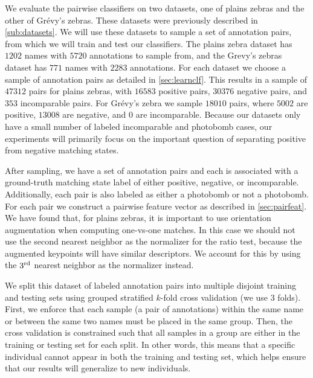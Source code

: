     We evaluate the pairwise classifiers on two datasets, one of plains zebras and the other of Grévy's zebras.
    These datasets were previously described in \cref{sub:datasets}.
    We will use these datasets to sample a set of annotation pairs, from which we will train and test our
      classifiers.
    The plains zebra dataset has $1202$ names with $5720$ annotations to sample from, and the Grevy's zebras
      dataset has $771$ names with $2283$ annotations.
    For each dataset we choose a sample of annotation pairs as detailed in \cref{sec:learnclf}.
    This results in a sample of $47312$ pairs for plains zebras, with $16583$ positive pairs, $30376$ negative
      pairs, and $353$ incomparable pairs.
    For Grévy's zebra we sample $18010$ pairs, where $5002$ are positive, $13008$ are negative, and $0$ are
      incomparable.
    Because our datasets only have a small number of labeled incomparable and photobomb cases, our experiments
      will primarily focus on the important question of separating positive from negative matching states.

    After sampling, we have a set of annotation pairs and each is associated with a ground-truth matching state
      label of either positive, negative, or incomparable.
    Additionally, each pair is also labeled as either a photobomb or not a photobomb.
    For each pair we construct a pairwise feature vector as described in \cref{sec:pairfeat}.
    We have found that, for plains zebras, it is important to use orientation augmentation when computing
      one-vs-one matches.
    In this case we should not use the second nearest neighbor as the normalizer for the ratio test, because the
      augmented keypoints will have similar descriptors.
    We account for this by using the $3^{\textrm{rd}}$ nearest neighbor as the normalizer instead.

    We split this dataset of labeled annotation pairs into multiple disjoint training and testing sets using
    grouped stratified $k$-fold cross validation (we use $3$ folds). First, we enforce that each sample (a pair of
    annotations) within the same name or between the same two names must be placed in the same group. Then, the
    cross validation is constrained such that all samples in a group are either in the training or testing set for
    each split. In other words, this means that a specific individual cannot appear in both the training and
    testing set, which helps ensure that our results will generalize to new individuals.

